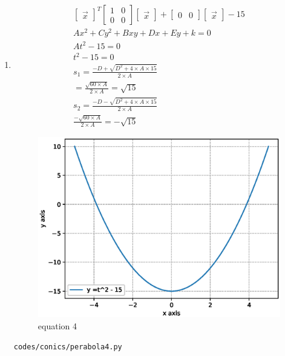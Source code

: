 \begin{enumerate}[label=\arabic*.,ref=\thesubsection.\theenumi]
\item
\begin{align}
\begin{bmatrix}\vec x\end{bmatrix}^T\begin{bmatrix}1 & 0\\0 & 0\end{bmatrix}\begin{bmatrix}\vec x\end{bmatrix} + \begin{bmatrix}0 & 0\end{bmatrix}\begin{bmatrix}\vec x\end{bmatrix} -15
\\
Ax^2+Cy^2+Bxy+Dx+Ey+k =0
\\
At^2 - 15= 0
\\
t^2 - 15 = 0
\\
s_1 =  \frac{-D + \sqrt{D^2 + 4\times A\times 15 }}{2\times A}
\\
=  \frac{ \sqrt{60\times A }}{2\times A} = \sqrt {15}
\\
s_2 =  \frac{-D - \sqrt{D^2 + 4\times A\times 15 }}{2\times A}
\\
\frac{ - \sqrt{ 60\times A }}{2\times A} = -\sqrt {15}
\end{align}
\begin{figure}[!ht]
	\centering
	\includegraphics[width=\columnwidth]{./figures/conics/perabola4.eps}
	\caption{equation 4 }
	\label{fig:perabola4}
\end{figure}
\begin{lstlisting}
codes/conics/perabola4.py
\end{lstlisting}


\end{enumerate}
